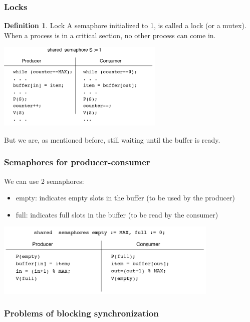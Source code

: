 \documentclass{article}
\theoremstyle{definition}
\newtheorem{definition}{Definition}[section]
\begin{document}
\subsubsection{Locks}

\begin{definition}{Lock}
A semaphore initialized to 1, is called a lock (or a mutex). When a process is in a critical section, no other process can come in.
\begin{center}
	\includegraphics[width=0.6\textwidth]{lock}
\end{center}
\end{definition}

But we are, as mentioned before, still waiting until the buffer is ready.

\subsubsection{Semaphores for producer-consumer}

We can use 2 semaphores:
\begin{itemize}
	\item empty: indicates empty slots in the buffer (to be used by the producer)
	\item full: indicates full slots in the buffer (to be read by the consumer)
\end{itemize}
\begin{center}
	\includegraphics[width=0.8\textwidth]{sema_prod_consom}
\end{center}

\subsubsection{Problems of blocking synchronization}
\end{document}
